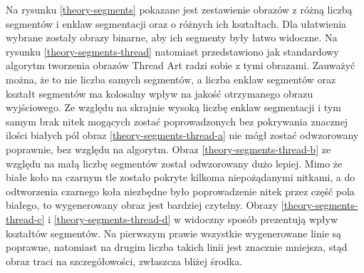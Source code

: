         Na rysunku \ref{theory-segments} pokazane jest zestawienie obrazów z różną liczbą segmentów i enklaw segmentacji oraz o różnych ich kształtach. Dla ułatwienia wybrane zostały obrazy binarne, aby ich segmenty były łatwo widoczne. Na rysunku \ref{theory-segments-thread} natomiast przedstawiono jak standardowy algorytm tworzenia obrazów Thread Art radzi sobie z tymi obrazami. Zauważyć można, że to nie liczba samych segmentów, a liczba enklaw segmentów oraz kształt segmentów ma kolosalny wpływ na jakość otrzymanego obrazu wyjściowego. Ze względu na skrajnie wysoką liczbę enklaw segmentacji i tym samym brak nitek mogących zostać poprowadzonych bez pokrywania znacznej ilości białych pól obraz \ref{theory-segments-thread-a} nie mógł zostać odwzorowany poprawnie, bez względu na algorytm. Obraz \ref{theory-segments-thread-b} ze względu na małą liczbę segmentów został odwzorowany dużo lepiej. Mimo że białe koło na czarnym tle zostało pokryte kilkoma niepożądanymi nitkami, a do odtworzenia czarnego koła niezbędne było poprowadzenie nitek przez część pola białego, to wygenerowany obraz jest bardziej czytelny. Obrazy \ref{theory-segments-thread-c} i \ref{theory-segments-thread-d} w widoczny sposób prezentują wpływ kształtów segmentów. Na pierwszym prawie wszystkie wygenerowane linie są poprawne, natomiast na drugim liczba takich linii jest znacznie mniejsza, stąd obraz traci na szczegółowości, zwłaszcza bliżej środka.
        
